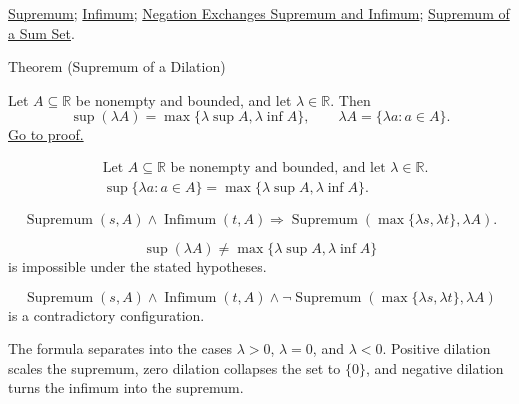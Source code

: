 \begin{dependencies}
\hyperref[def:supremum]{Supremum};
\hyperref[def:infimum]{Infimum};
\hyperref[thm:negation-exchange-sup-inf]{Negation Exchanges Supremum and Infimum};
\hyperref[thm:supremum-sum-set]{Supremum of a Sum Set}.
\end{dependencies}


\begin{theorembox}{Theorem (Supremum of a Dilation)}
\begin{theorem}
\label{thm:supremum-dilation}
Let $A\subseteq\mathbb{R}$ be nonempty and bounded, and let $\lambda\in\mathbb{R}$. Then
\[
  \sup(\lambda A)=\max\{\lambda\sup A,\lambda\inf A\},
  \qquad
  \lambda A=\{\lambda a:a\in A\}.
\]
\hyperref[prf:supremum-dilation]{Go to proof.}
\end{theorem}
\end{theorembox}

\begin{remark*}
\[
\begin{aligned}
&\text{Let }A\subseteq\mathbb{R}\text{ be nonempty and bounded, and let }\lambda\in\mathbb{R}.\\
&\sup\{\lambda a:a\in A\}=\max\{\lambda\sup A,\lambda\inf A\}.
\end{aligned}
\]
\end{remark*}

\begin{remark*}
\[
\operatorname{Supremum}(s,A)\land \operatorname{Infimum}(t,A)
\Longrightarrow
\operatorname{Supremum}(\max\{\lambda s,\lambda t\},\lambda A).
\]
\end{remark*}

\begin{remark*}
\[
\sup(\lambda A)\ne \max\{\lambda\sup A,\lambda\inf A\}
\]
is impossible under the stated hypotheses.
\end{remark*}

\begin{remark*}
\[
\operatorname{Supremum}(s,A)\land \operatorname{Infimum}(t,A)
\land
\neg\operatorname{Supremum}(\max\{\lambda s,\lambda t\},\lambda A)
\]
is a contradictory configuration.
\end{remark*}

\begin{remark*}
The formula separates into the cases $\lambda>0$, $\lambda=0$, and $\lambda<0$. Positive dilation scales the supremum, zero dilation collapses the set to $\{0\}$, and negative dilation turns the infimum into the supremum.
\end{remark*}

